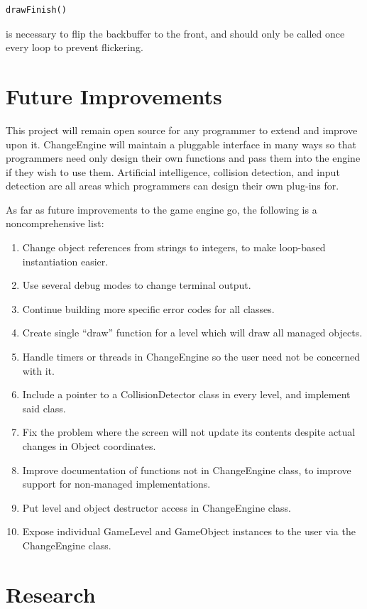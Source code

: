 \documentclass[12pt]{article}
\begin{document}
\begin{verbatim}drawFinish()\end{verbatim} is necessary to flip the backbuffer to the front, and should only be called once every loop to prevent flickering.

  \section{Future Improvements}
    This project will remain open source for any programmer to extend and improve upon it. ChangeEngine will maintain a pluggable interface in many ways so that programmers need only design their own functions and pass them into the engine if they wish to use them. Artificial intelligence, collision detection, and input detection are all areas which programmers can design their own plug-ins for.

As far as future improvements to the game engine go, the following is a noncomprehensive list:

\begin{enumerate}
 \item Change object references from strings to integers, to make loop-based instantiation easier.
 \item Use several debug modes to change terminal output.
 \item Continue building more specific error codes for all classes.
 \item Create single ``draw'' function for a level which will draw all managed objects.
 \item Handle timers or threads in ChangeEngine so the user need not be concerned with it.
 \item Include a pointer to a CollisionDetector class in every level, and implement said class.
 \item Fix the problem where the screen will not update its contents despite actual changes in Object coordinates.
 \item Improve documentation of functions not in ChangeEngine class, to improve support for non-managed implementations.
 \item Put level and object destructor access in ChangeEngine class.
 \item Expose individual GameLevel and GameObject instances to the user via the ChangeEngine class.
\end{enumerate}


  \newpage

  \appendix
  \section{Research}
\end{document}
